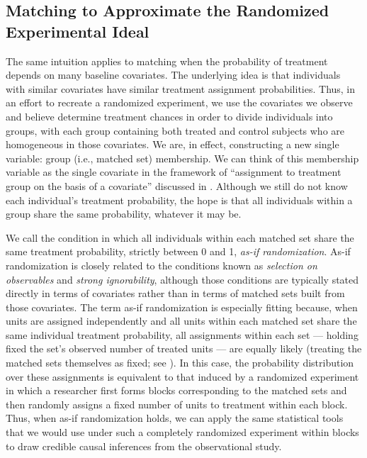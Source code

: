 \documentclass[
  12pt,
  leqno]{article}
\begin{document}
\subsection{Matching to Approximate the Randomized Experimental
Ideal}\label{matching-to-approximate-the-randomized-experimental-ideal}

The same intuition applies to matching when the probability of treatment
depends on many baseline covariates. The underlying idea is that
individuals with similar covariates have similar treatment assignment
probabilities. Thus, in an effort to recreate a randomized experiment,
we use the covariates we observe and believe determine treatment chances
in order to divide individuals into groups, with each group containing
both treated and control subjects who are homogeneous in those
covariates. We are, in effect, constructing a new single variable: group
(i.e., matched set) membership. We can think of this membership variable
as the single covariate in the framework of ``assignment to treatment
group on the basis of a covariate'' \citep{rubin1977} discussed in
.
Although we still do not know each individual's treatment probability,
the hope is that all individuals within a group share the same
probability, whatever it may be.

We call the condition in which all individuals within each matched set
share the same treatment probability, strictly between 0 and 1,
\emph{as-if randomization}. As-if randomization is closely related to
the conditions known as \emph{selection on observables} and \emph{strong
ignorability}, although those conditions are typically stated directly
in terms of covariates rather than in terms of matched sets built from
those covariates. The term as-if randomization is especially fitting
because, when units are assigned independently and all units within each
matched set share the same individual treatment probability, all
assignments within each set --- holding fixed the set's observed number
of treated units --- are equally likely (treating the matched sets
themselves as fixed; see
). In this case,
the probability distribution over these assignments is equivalent to
that induced by a randomized experiment in which a researcher first
forms blocks corresponding to the matched sets and then randomly assigns
a fixed number of units to treatment within each block. Thus, when as-if
randomization holds, we can apply the same statistical tools that we
would use under such a completely randomized experiment within blocks to
draw credible causal inferences from the observational study.
\end{document}
